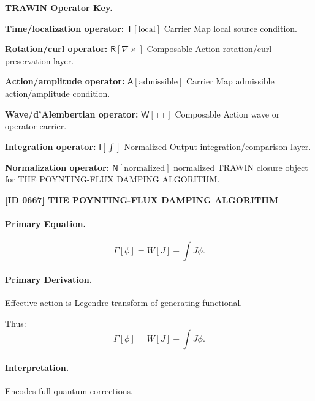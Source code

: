 \par\vspace{0.45\baselineskip}
\noindent\begin{minipage}[t]{\linewidth}
\begingroup
\small
\raggedright
\textbf{TRAWIN Operator Key.}\par
\noindent\textbf{Time/localization operator:} $\mathsf{T}\!\left[\mathrm{local}\right]$ Carrier Map local source condition.\par
\noindent\textbf{Rotation/curl operator:} $\mathsf{R}\!\left[\nabla\times\right]$ Composable Action rotation/curl preservation layer.\par
\noindent\textbf{Action/amplitude operator:} $\mathsf{A}\!\left[\mathrm{admissible}\right]$ Carrier Map admissible action/amplitude condition.\par
\noindent\textbf{Wave/d'Alembertian operator:} $\mathsf{W}\!\left[\Box\right]$ Composable Action wave or operator carrier.\par
\noindent\textbf{Integration operator:} $\mathsf{I}\!\left[\int\right]$ Normalized Output integration/comparison layer.\par
\noindent\textbf{Normalization operator:} $\mathsf{N}\!\left[\mathrm{normalized}\right]$ normalized TRAWIN closure object for THE POYNTING-FLUX DAMPING ALGORITHM.\par
\endgroup
\end{minipage}

\clearpage
\noindent\textbf{[ID 0667] THE POYNTING-FLUX DAMPING ALGORITHM}\par
\vspace{0.35em}
\paragraph{Primary Equation.}
\begin{equation}
\Gamma[\phi] = W[J] - \int J\phi.
\end{equation}

\paragraph{Primary Derivation.}
Effective action is Legendre transform of generating functional.

Thus:
\begin{equation}
\boxed{
\Gamma[\phi] = W[J] - \int J\phi.
}
\end{equation}

\paragraph{Interpretation.}
Encodes full quantum corrections.

